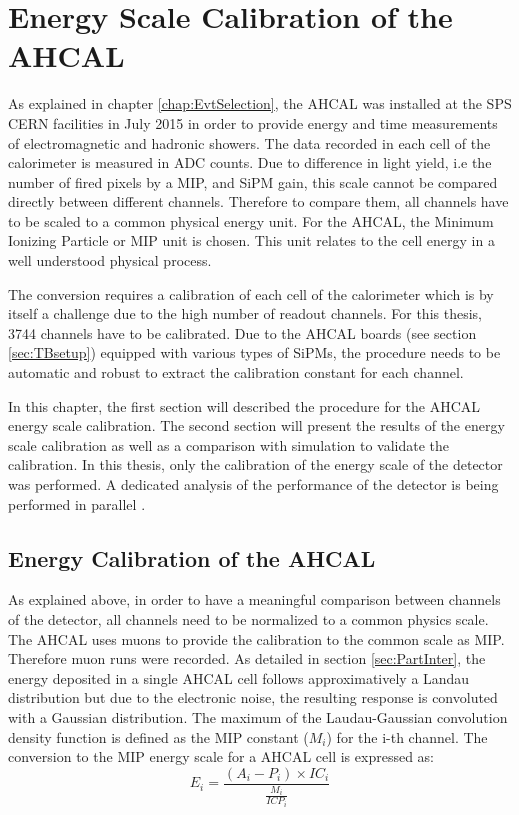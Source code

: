 \chapter{Energy Scale Calibration of the AHCAL}
\label{chap:ECalibAHCAL}

As explained in chapter \ref{chap:EvtSelection}, the AHCAL was installed at the SPS CERN facilities in July 2015 in order to provide energy and time measurements of electromagnetic and hadronic showers. The data recorded in each cell of the calorimeter is measured in ADC counts. Due to difference in light yield, i.e the number of fired pixels by a MIP, and SiPM gain, this scale cannot be compared directly between different channels. Therefore to compare them, all channels have to be scaled to a common physical energy unit. For the AHCAL, the Minimum Ionizing Particle or MIP unit is chosen. This unit relates to the cell energy in a well understood physical process.

The conversion requires a calibration of each cell of the calorimeter which is by itself a challenge due to the high number of readout channels. For this thesis, 3744 channels have to be calibrated. Due to the AHCAL boards (see section \ref{sec:TBsetup}) equipped with various types of SiPMs, the procedure needs to be automatic and robust to extract the calibration constant for each channel.

In this chapter, the first section will described the procedure for the AHCAL energy scale calibration. The second section will present the results of the energy scale calibration as well as a comparison with simulation to validate the calibration. In this thesis, only the calibration of the energy scale of the detector was performed. A dedicated analysis of the performance of the detector is being performed in parallel \cite{AmbraEnergy, AmbraTokyo}.

\section{Energy Calibration of the AHCAL}

As explained above, in order to have a meaningful comparison between channels of the detector, all channels need to be normalized to a common physics scale. The AHCAL uses muons to provide the calibration to the common scale as MIP. Therefore muon runs were recorded. As detailed in section \ref{sec:PartInter}, the energy deposited in a single AHCAL cell follows approximatively a Landau distribution but due to the electronic noise, the resulting response is convoluted with a Gaussian distribution. The maximum of the Laudau-Gaussian convolution density function is defined as the MIP constant ($M_{i}$) for the i-th channel. The conversion to the MIP energy scale for a AHCAL cell is expressed as:
\begin{equation}
	E_i = \frac{(A_i - P_i) \times IC_i }{\frac{M_{i}}{ICP_i}}
\end{equation}


